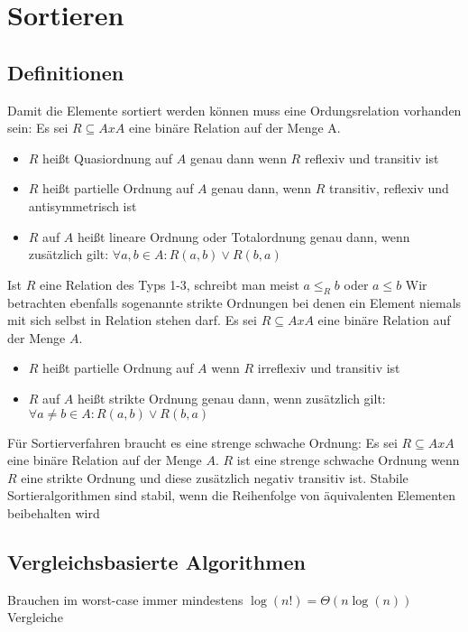 	\section{Sortieren}
	\subsection{Definitionen}
	Damit die Elemente sortiert werden können muss eine Ordungsrelation vorhanden sein: \newline \newline
	Es sei $R\subseteq AxA$ eine binäre Relation auf der Menge A.
	\begin{itemize}
		\item $R$ heißt Quasiordnung auf $A$ genau dann wenn $R$ reflexiv und transitiv ist
		\item $R$ heißt partielle Ordnung auf $A$ genau dann, wenn $R$ transitiv, reflexiv und antisymmetrisch ist
		\item $R$ auf $A$ heißt lineare Ordnung oder Totalordnung genau dann, wenn zusätzlich gilt: $\forall a, b\in A:R(a, b)\lor R(b, a)$
	\end{itemize}
	Ist $R$ eine Relation des Typs 1-3, schreibt man meist $a\leq_Rb$ oder $a\leq b$ \newline
	Wir betrachten ebenfalls sogenannte strikte Ordnungen bei denen ein Element niemals mit sich selbst in Relation  stehen darf. \newline \newline
	Es sei $R\subseteq AxA$ eine binäre Relation auf der Menge $A$.
	\begin{itemize}
	  \item $R$ heißt partielle Ordnung auf $A$ wenn $R$ irreflexiv und transitiv ist
	  \item $R$ auf $A$ heißt strikte Ordnung genau dann, wenn zusätzlich gilt: \newline
	  		$\forall a\not= b\in A:R(a,b)\lor R(b,a)$
	\end{itemize} 
	Für Sortierverfahren braucht es eine strenge schwache Ordnung: \newline \newline
	Es sei $R\subseteq AxA$ eine binäre Relation auf der Menge $A$. $R$ ist eine strenge schwache Ordnung wenn $R$ eine strikte Ordnung und diese zusätzlich negativ transitiv ist. \newline
	Stabile Sortieralgorithmen sind stabil, wenn die Reihenfolge von äquivalenten Elementen beibehalten wird
	\subsection{Vergleichsbasierte Algorithmen}
	Brauchen im worst-case immer mindestens $\log(n!)=\Theta(n\log(n))$ Vergleiche
